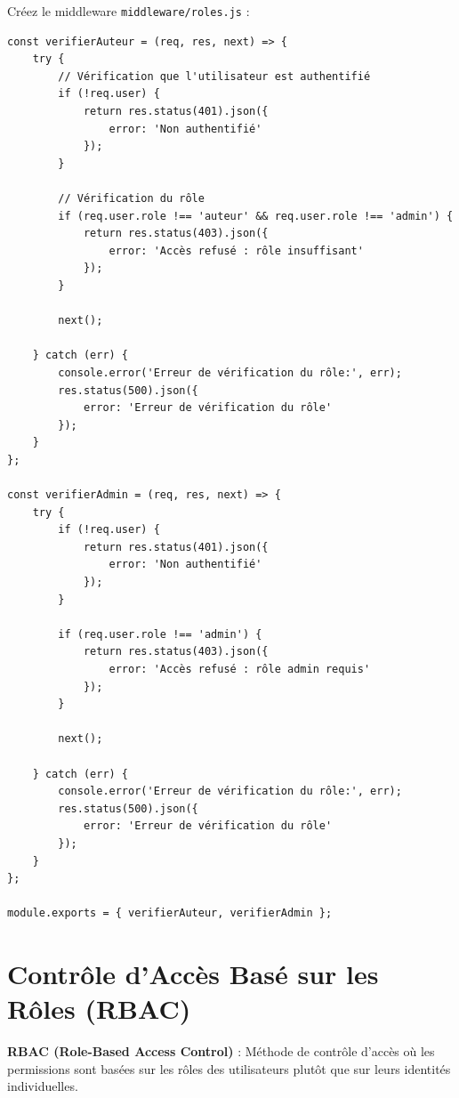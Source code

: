 Créez le middleware \texttt{middleware/roles.js} :

\begin{lstlisting}[style=javascript, caption=middleware/roles.js - Middleware vérifierAuteur]
const verifierAuteur = (req, res, next) => {
    try {
        // Vérification que l'utilisateur est authentifié
        if (!req.user) {
            return res.status(401).json({ 
                error: 'Non authentifié' 
            });
        }
        
        // Vérification du rôle
        if (req.user.role !== 'auteur' && req.user.role !== 'admin') {
            return res.status(403).json({ 
                error: 'Accès refusé : rôle insuffisant' 
            });
        }
        
        next();
        
    } catch (err) {
        console.error('Erreur de vérification du rôle:', err);
        res.status(500).json({ 
            error: 'Erreur de vérification du rôle' 
        });
    }
};

const verifierAdmin = (req, res, next) => {
    try {
        if (!req.user) {
            return res.status(401).json({ 
                error: 'Non authentifié' 
            });
        }
        
        if (req.user.role !== 'admin') {
            return res.status(403).json({ 
                error: 'Accès refusé : rôle admin requis' 
            });
        }
        
        next();
        
    } catch (err) {
        console.error('Erreur de vérification du rôle:', err);
        res.status(500).json({ 
            error: 'Erreur de vérification du rôle' 
        });
    }
};

module.exports = { verifierAuteur, verifierAdmin };
\end{lstlisting}

\section{Contrôle d'Accès Basé sur les Rôles (RBAC)}

\begin{definitionbox}
    \textbf{RBAC (Role-Based Access Control)} : Méthode de contrôle d'accès où les permissions sont basées sur les rôles des utilisateurs plutôt que sur leurs identités individuelles.
\end{definitionbox}

